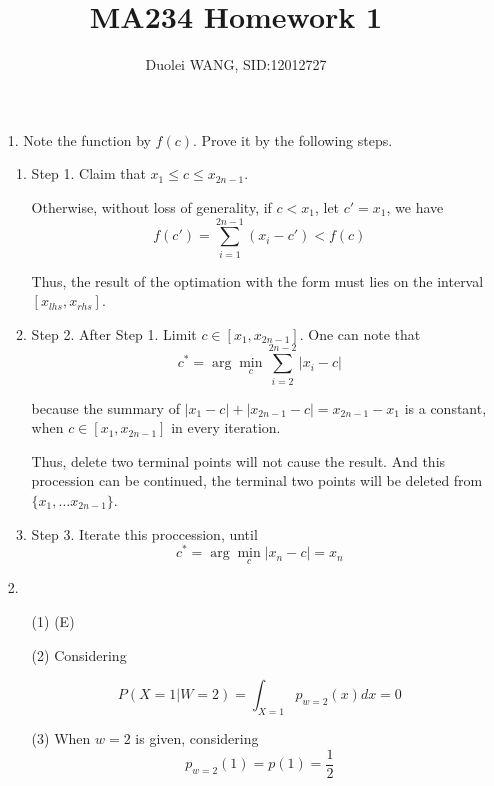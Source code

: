 \documentclass{article}
\title{MA234 Homework 1}
\author{Duolei WANG, SID:12012727}
\affil{wangdl2020@mail.sustech.edu.cn}
\date{}
\begin{document}
\maketitle

\begin{enumerate}
\item[1.] Note the function by \(f(c)\). Prove it by the following steps.
\begin{enumerate}
    \item Step 1. Claim that \(x_1 \le c \le x_{2n - 1}\). 
    
    Otherwise, without loss of generality, if \(c < x_1\), let \(c' = x_1\), we have
    \[f(c') = \sum_{i = 1}^{2n - 1} (x_i - c') < f(c)\]

    Thus, the result of the optimation with the form must lies on the interval \([x_{lhs}, x_{rhs}]\).

    \item Step 2. After Step 1. Limit \(c \in [x_1, x_{2n - 1}]\).  One can note that
    \[c^* = \arg \min_c \sum_{i = 2}^{2n - 2}|x_i - c|\]
    
    because the summary of \(|x_1 - c| + |x_{2n - 1} - c| = x_{2n - 1} - x_1\) is a constant, when \(c \in [x_1, x_{2n - 1}]\) in every iteration. 
    
    Thus, delete two terminal points will not cause the result. And this procession can be continued, the terminal two points will be deleted from \(\{x_1, \ldots x_{2n - 1}\}\).
    \item Step 3. Iterate this proccession, until
    \[c^* = \arg \min_c |x_n - c| = x_n\]
\end{enumerate} 


\item[2.]

\begin{enumerate}
    \item[(1)] (E)
    \item[(2)] Considering
    
    \[P(X = 1 | W = 2) = \int_{X = 1}p_{w = 2}(x)dx = 0\]


    \item[(3)] When \(w = 2\) is given, considering
    \[p_{w = 2}(1) = p(1) = \frac{1}{2}\]
\end{enumerate}


\end{enumerate}
\end{document}
